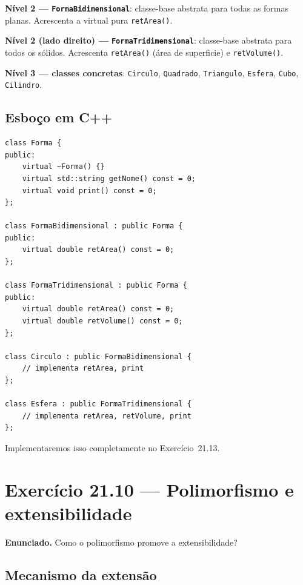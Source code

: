 \documentclass[11pt,a4paper]{article}
\begin{document}
\textbf{N\'ivel 2 --- \texttt{FormaBidimensional}}: classe-base abstrata para todas as formas planas. Acrescenta a virtual pura \texttt{retArea()}.

\textbf{N\'ivel 2 (lado direito) --- \texttt{FormaTridimensional}}: classe-base abstrata para todos os s\'olidos. Acrescenta \texttt{retArea()} (\'area de superficie) e \texttt{retVolume()}.

\textbf{N\'ivel 3 --- classes concretas}: \texttt{Circulo}, \texttt{Quadrado}, \texttt{Triangulo}, \texttt{Esfera}, \texttt{Cubo}, \texttt{Cilindro}.

\subsection*{Esbo\c{c}o em C++}

\begin{lstlisting}[style=cppcode,numbers=none]
class Forma {
public:
    virtual ~Forma() {}
    virtual std::string getNome() const = 0;
    virtual void print() const = 0;
};

class FormaBidimensional : public Forma {
public:
    virtual double retArea() const = 0;
};

class FormaTridimensional : public Forma {
public:
    virtual double retArea() const = 0;
    virtual double retVolume() const = 0;
};

class Circulo : public FormaBidimensional {
    // implementa retArea, print
};

class Esfera : public FormaTridimensional {
    // implementa retArea, retVolume, print
};
\end{lstlisting}

\noindent Implementaremos isso completamente no Exerc\'icio~21.13.

\newpage
\section{Exerc\'icio 21.10 --- Polimorfismo e extensibilidade}

\begin{enunciado}
\textbf{Enunciado.} Como o polimorfismo promove a extensibilidade?
\end{enunciado}

\subsection*{Mecanismo da extens\~ao}
\end{document}
